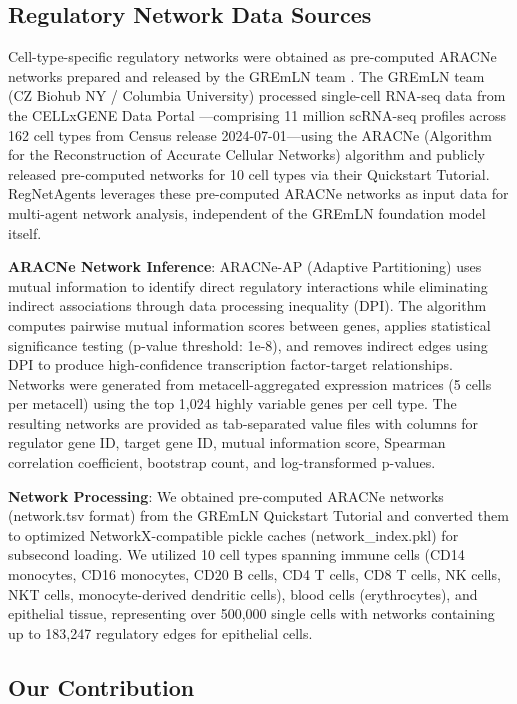 \documentclass[11pt]{article}
\begin{document}
\subsection{Regulatory Network Data Sources}

Cell-type-specific regulatory networks were obtained as pre-computed ARACNe networks prepared and released by the GREmLN team \cite{gremln2025}. The GREmLN team (CZ Biohub NY / Columbia University) processed single-cell RNA-seq data from the CELLxGENE Data Portal \cite{cellxgene2021}---comprising 11 million scRNA-seq profiles across 162 cell types from Census release 2024-07-01---using the ARACNe (Algorithm for the Reconstruction of Accurate Cellular Networks) algorithm \cite{aracne2006,aracneap2016} and publicly released pre-computed networks for 10 cell types via their Quickstart Tutorial. RegNetAgents leverages these pre-computed ARACNe networks as input data for multi-agent network analysis, independent of the GREmLN foundation model itself.

\textbf{ARACNe Network Inference}: ARACNe-AP (Adaptive Partitioning) uses mutual information to identify direct regulatory interactions while eliminating indirect associations through data processing inequality (DPI). The algorithm computes pairwise mutual information scores between genes, applies statistical significance testing (p-value threshold: 1e-8), and removes indirect edges using DPI to produce high-confidence transcription factor-target relationships. Networks were generated from metacell-aggregated expression matrices (5 cells per metacell) using the top 1,024 highly variable genes per cell type. The resulting networks are provided as tab-separated value files with columns for regulator gene ID, target gene ID, mutual information score, Spearman correlation coefficient, bootstrap count, and log-transformed p-values.

\textbf{Network Processing}: We obtained pre-computed ARACNe networks (network.tsv format) from the GREmLN Quickstart Tutorial and converted them to optimized NetworkX-compatible pickle caches (network\_index.pkl) for subsecond loading. We utilized 10 cell types spanning immune cells (CD14 monocytes, CD16 monocytes, CD20 B cells, CD4 T cells, CD8 T cells, NK cells, NKT cells, monocyte-derived dendritic cells), blood cells (erythrocytes), and epithelial tissue, representing over 500,000 single cells with networks containing up to 183,247 regulatory edges for epithelial cells.

\subsection{Our Contribution}
\end{document}
